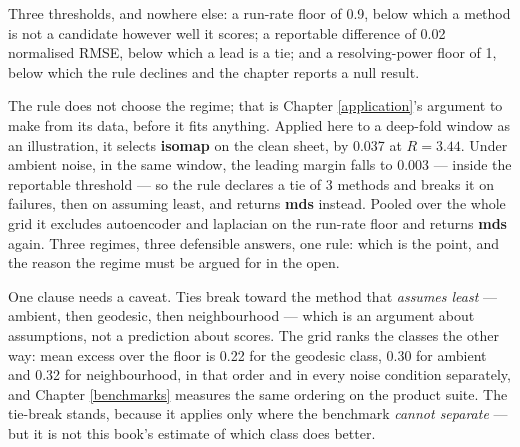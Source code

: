 \documentclass[
  british,
  a4paper,
]{book}
\newenvironment{Shaded}{\begin{snugshade}}{\end{snugshade}}
\newcommand{\AttributeTok}[1]{\textcolor[rgb]{0.13,0.29,0.53}{#1}}
\newcommand{\DecValTok}[1]{\textcolor[rgb]{0.00,0.00,0.81}{#1}}
\newcommand{\FunctionTok}[1]{\textcolor[rgb]{0.13,0.29,0.53}{\textbf{#1}}}
\newcommand{\NormalTok}[1]{#1}
\newcommand{\OtherTok}[1]{\textcolor[rgb]{0.56,0.35,0.01}{#1}}
\newcommand{\SpecialCharTok}[1]{\textcolor[rgb]{0.81,0.36,0.00}{\textbf{#1}}}
\newcommand{\StringTok}[1]{\textcolor[rgb]{0.31,0.60,0.02}{#1}}
\newcounter{none} %
\begin{document}
Three thresholds, and nowhere else: a run-rate floor of 0.9, below
which a method is not a candidate however well it scores; a reportable
difference of 0.02 normalised RMSE, below which a lead is a tie;
and a resolving-power floor of 1, below which the rule declines
and the chapter reports a null result.

\begin{Shaded}
\end{Shaded}

The rule does not choose the regime; that is Chapter \ref{application}'s
argument to make from its data, before it fits anything. Applied here to a
deep-fold window as an illustration, it selects \textbf{isomap} on the
clean sheet, by 0.037 at
\(R = 3.44\). Under ambient noise, in the same window,
the leading margin falls to
0.003 --- inside the reportable
threshold --- so the rule declares a tie of 3 methods and
breaks it on failures, then on assuming least, and returns
\textbf{mds} instead. Pooled over the whole grid it excludes
autoencoder and laplacian on the run-rate floor and returns
\textbf{mds} again. Three regimes, three defensible answers, one rule:
which is the point, and the reason the regime must be argued for in the open.

One clause needs a caveat. Ties break toward the method that \emph{assumes least} ---
ambient, then geodesic, then neighbourhood --- which is an argument about
assumptions, not a prediction about scores. The grid ranks the classes the other
way: mean excess over the floor is 0.22
for the geodesic class,
0.30 for ambient and
0.32 for neighbourhood,
in that order and in every noise condition
separately, and Chapter \ref{benchmarks} measures the same ordering on the
product suite. The tie-break stands, because it applies only where the benchmark
\emph{cannot separate} --- but it is not this book's estimate of which class does
better.
\end{document}

